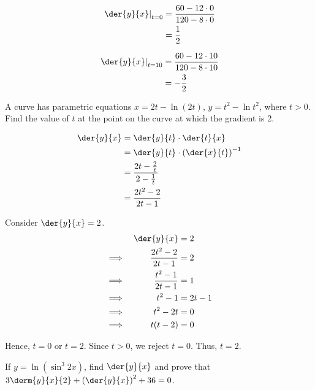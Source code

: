 \documentclass{jhwhw}
\begin{document}
        \begin{align*}
            \left.\der{y}{x}\right|_{t = 0} &= \dfrac{60 - 12\cdot 0}{120 - 8\cdot0}\\
            &= \dfrac12
        \end{align*}

        \begin{align*}
            \left.\der{y}{x}\right|_{t = 10} &= \dfrac{60 - 12\cdot 10}{120 - 8\cdot10}\\
            &= -\dfrac32
        \end{align*}


    \problem{}
        A curve has parametric equations $x = 2t-\ln (2t), \, y = t^2 - \ln t^2$, where $t > 0$. Find the value of $t$ at the point on the curve at which the gradient is 2.

    \solution
        \begin{align*}
            \der{y}{x} &= \der{y}{t} \cdot \der{t}{x}\\
            &= \der{y}{t} \cdot \left(\der{x}{t}\right)^{-1}\\
            &= \dfrac{2t - \tfrac2t}{2 - \tfrac1t}\\
            &= \dfrac{2t^2 - 2}{2t - 1}
        \end{align*}

        Consider $\der{y}{x} = 2$.
        \begin{alignat*}{2}
            &&\der{y}{x} &= 2\\
            \implies&&\dfrac{2t^2 - 2}{2t - 1} &= 2\\
            \implies&&\dfrac{t^2 - 1}{2t - 1} &= 1\\
            \implies&&t^2 - 1 &= 2t -1\\
            \implies&&t^2 - 2t &= 0\\
            \implies&&t(t-2) &= 0
        \end{alignat*}

        Hence, $t = 0$ or $t = 2$. Since $t > 0$, we reject $t = 0$. Thus, $t = 2$.


    \problem{}
        If $y = \ln \left(\sin^3 2x\right)$, find $\der{y}{x}$ and prove that $3\derm{y}{x}{2} + \left(\der{y}{x}\right)^2 + 36 = 0$.
\end{document}
